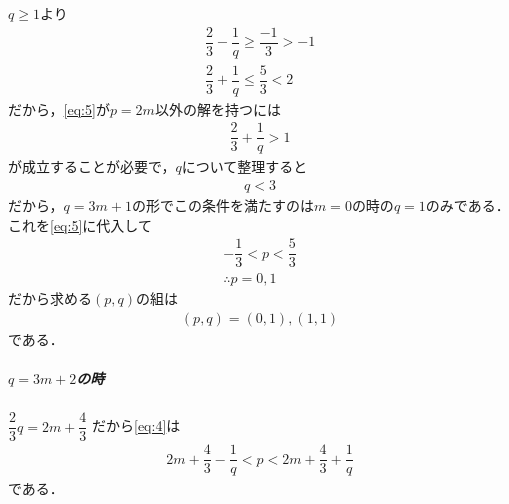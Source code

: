 \documentclass[../../main.tex]{subfiles}
\begin{document}
$q \ge 1$より
\begin{align}
  \dfrac{2}{3} - \dfrac{1}{q} \ge \dfrac{-1}{3} > -1 \\
  \dfrac{2}{3} + \dfrac{1}{q} \le \dfrac{5}{3}  < 2
\end{align}
だから，\cref{eq:5}が$p=2m$以外の解を持つには
\begin{align}
  \dfrac{2}{3} + \dfrac{1}{q} > 1
\end{align}
が成立することが必要で，$q$について整理すると
\begin{align}
  q < 3
\end{align}
だから，$q=3m+1$の形でこの条件を満たすのは$m=0$の時の$q=1$のみである．
これを\cref{eq:5}に代入して
\begin{align}
  -\dfrac{1}{3} < p < \dfrac{5}{3} \\
  \therefore
  p = 0, 1
\end{align}
だから求める$(p,q)$の組は
\begin{align}
  (p,q) = (0,1), (1,1) \label{eq:6}
\end{align}
である．

\subparagraph{$q = 3m+2$の時}
$\dfrac{2}{3}q = 2m + \dfrac{4}{3}$ だから\cref{eq:4}は
\begin{align}
  2m + \dfrac{4}{3} - \dfrac{1}{q} < p < 2m + \dfrac{4}{3} + \dfrac{1}{q} \label{eq:7}
\end{align}
である．
\end{document}
